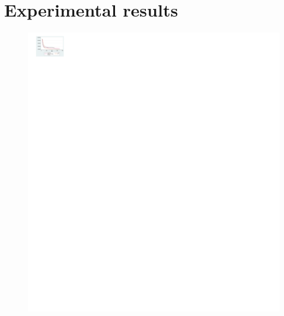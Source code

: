 \section{Experimental results} \label{section:results}



\begin{figure}[tb]
 \includegraphics[width=\columnwidth]{figure/result_layered_depthmap.pdf}
 \caption{}\label{fig:result_layered_depthmap}
\end{figure}
